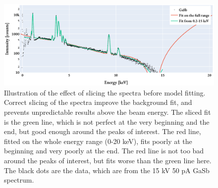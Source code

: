 \begin{figure}[htbp]
    \centering
    \includegraphics[width=0.85\linewidth]{figures/discussion/model_slicing_fit.pdf}
    \caption{
        Illustration of the effect of slicing the spectra before model fitting.
        Correct slicing of the spectra improve the background fit, and prevents unpredictable results above the beam energy.
        The sliced fit is the green line, which is not perfect at the very beginning and the end, but good enough around the peaks of interest.
        The red line, fitted on the whole energy range (0-20 keV), fits poorly at the beginning and very poorly at the end.
        The red line is not too bad around the peaks of interest, but fits worse than the green line here.
        The black dots are the data, which are from the 15 kV 50 pA GaSb spectrum.
    }
    \label{fig:discussion:model_slicing_fit}
\end{figure}



